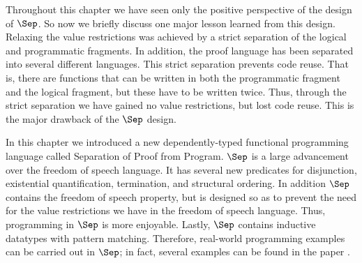 Throughout this chapter we have seen only the positive perspective of
the design of $\Sep$.  So now we briefly discuss one major lesson
learned from this design.  Relaxing the value restrictions was
achieved by a strict separation of the logical and programmatic
fragments.  In addition, the proof language has been separated into
several different languages.  This strict separation prevents code
reuse.  That is, there are functions that can be written in both the
programmatic fragment and the logical fragment, but these have to be
written twice.  Thus, through the strict separation we have gained no
value restrictions, but lost code reuse.  This is the major drawback
of the $\Sep$ design.  

In this chapter we introduced a new dependently-typed functional
programming language called Separation of Proof from Program.  $\Sep$
is a large advancement over the freedom of speech language.  It has
several new predicates for disjunction, existential quantification,
termination, and structural ordering.  In addition $\Sep$ contains the
freedom of speech property, but is designed so as to prevent the need
for the value restrictions we have in the freedom of speech language.
Thus, programming in $\Sep$ is more enjoyable.  Lastly, $\Sep$
contains inductive datatypes with pattern matching.  Therefore,
real-world programming examples can be carried out in $\Sep$; in fact,
several examples can be found in the paper \cite{Kimmel:2012}.
